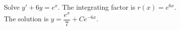 {Solve $y' + 6y = e^x$.}
{The integrating factor is $r(x)=e^{6x}$. \\
The solution is $y=\dfrac{e^x}{7}+Ce^{-6x}$.}